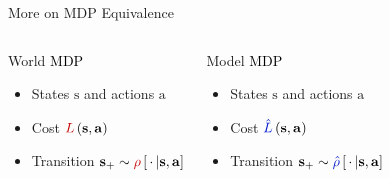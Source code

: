 \documentclass[lecture]{beamer}
\newcommand{\vect}[1]{\ensuremath{\boldsymbol{\mathrm{#1}}}}
\begin{document}
\begin{frame}{\normalsize More on MDP Equivalence}
\footnotesize
\vspace{-.25cm}
\begin{columns}[t]
\begin{block}{\footnotesize \textcolor{myRed}{World} \textcolor{black}{MDP}}
\begin{itemize}
\item States $\vect s$ and actions $\vect a$
\item Cost $\textcolor{myRed}{L}\left(\vect s,\vect a\right)$
\item Transition $\vect s_+\sim\textcolor{myRed}{\rho}\left[\,\cdot\,|\vect s,\vect a\right]$
\end{itemize}
\end{block}

\begin{block}{\footnotesize \textcolor{myBlue2}{Model} \textcolor{black}{MDP}}
\begin{itemize}
\item States $\vect s$ and actions $\vect a$
\item Cost $\textcolor{myBlue2}{\hat L}\left(\vect s,\vect a\right)$
\item Transition $\vect s_+\sim\textcolor{myBlue2}{\hat \rho}\left[\,\cdot\,|\vect s,\vect a\right]$
\end{itemize}
\end{block}


\end{columns}


\end{frame}
\end{document}
